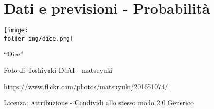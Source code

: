 \part{Dati e previsioni - Probabilità}

\texttt{[image: \\folder img/dice.png]}
  \begin{center}
    {\large ``Dice''}\par
    Foto di Toshiyuki IMAI - matsuyuki\par
    \url{https://www.flickr.com/photos/matsuyuki/201651074/}\par
    Licenza: Attribuzione - Condividi allo stesso modo 2.0 Generico\par
  \end{center}
\clearpage
\cleardoublepage
